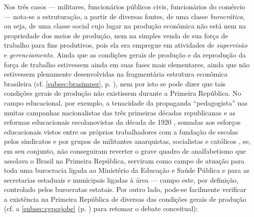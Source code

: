 Nos três casos --- militares, funcionários públicos civis, funcionários do comércio --- nota-se a estruturação, a partir de diversas fontes, de uma classe \textit{burocrática}, ou seja, de uma classe social cujo lugar na produção econômica não está nem na propriedade dos meios de produção, nem na simples venda de sua força de trabalho para fins produtivos, pois ela era empregue em atividades de \textit{supervisão} e \textit{gerenciamento}. Ainda que as condições gerais de produção e da reprodução da força de trabalho estivessem ainda em suas fases mais elementares, ainda que não estivessem plenamente desenvolvidas na fragmentária estrutura econômica brasileira (cf. \autoref{subsec:brasimper}, p. \pageref{subsec:brasimper}), nem por isto se pode dizer que tais condições gerais de produção não existissem durante a Primeira República. No campo educacional, por exemplo, a tenacidade da propaganda ``pedagogista'' nas muitas campanhas nacionalistas das três primeiras décadas republicanas e as reformas educacionais escolanovistas da década de 1920 \cite{nagle_educacao_1977}, somadas aos esforços educacionais vistos entre os próprios trabalhadores com a fundação de escolas pelos sindicatos e por grupos de militantes anarquistas, socialistas e católicos \cite{andradeneto_educana_2014,ghiraldelli_educmovop_1987}, se, em seu conjunto, não conseguiram reverter o grave quadro de analfabetismo que assolava o Brasil na Primeira República, serviram como campo de atuação para toda uma burocracia ligada ao Ministério da Educação e Saúde Pública e para as secretarias estaduais e municipais ligadas à área --- campo este, por definição, controlado pelos burocratas estatais. Por outro lado, pode-se facilmente verificar a existência na Primeira República de diversas das condições gerais de produção (cf. a \autoref{subsec:cgpcsjobe} (p. \pageref{subsec:cgpcsjobe}) para retomar o debate conceitual):

